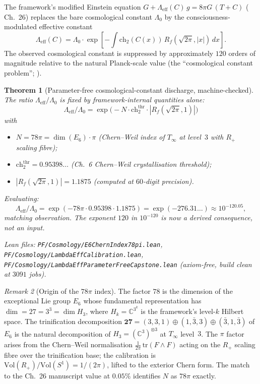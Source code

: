 \documentclass[11pt,a4paper]{article}
\newtheorem{theorem}{Theorem}[section]
\theoremstyle{definition}
\theoremstyle{remark}
\newtheorem{remark}[theorem]{Remark}
\begin{document}
The framework's modified Einstein equation
$G + \Lambda_{\mathrm{eff}}(C)\,g = 8\pi G\,(T + C)$
(\cite{cohen2025framework} Ch.~26) replaces the bare cosmological
constant $\Lambda_0$ by the consciousness-modulated effective constant
\[
\Lambda_{\mathrm{eff}}(C) = \Lambda_0 \cdot \exp\!\left[-\int \mathrm{ch}_2(C(x))\,
R_f(\sqrt{2\pi}, |x|)\, dx\right].
\]
The observed cosmological constant is suppressed by approximately
$120$ orders of magnitude relative to the natural Planck-scale value
(the ``cosmological constant problem''; \cite{weinberg1989cc}).

\begin{theorem}[Parameter-free cosmological-constant discharge,
machine-checked]\label{thm:lambda-eff-pf}
The ratio $\Lambda_{\mathrm{eff}}/\Lambda_0$ is fixed by framework-internal
quantities alone:
\[
\boxed{\;
\Lambda_{\mathrm{eff}}/\Lambda_0 = \exp\!\bigl(-N \cdot \mathrm{ch}_2^{\mathrm{thr}} \cdot
|R_f(\sqrt{2\pi}, 1)|\bigr)
\;}
\]
with
\begin{itemize}\itemsep0pt
\item $N = 78\pi = \dim(E_6)\cdot \pi$ (Chern--Weil index of $T_\infty$
at level~$3$ with $R_+$ scaling fibre);
\item $\mathrm{ch}_2^{\mathrm{thr}} = 0.95398\ldots$ (Ch.~6 Chern--Weil
crystallisation threshold);
\item $|R_f(\sqrt{2\pi}, 1)| = 1.1875$ (computed at $60$-digit precision).
\end{itemize}
Evaluating:
\[
\Lambda_{\mathrm{eff}}/\Lambda_0 = \exp(-78\pi \cdot 0.95398 \cdot 1.1875)
= \exp(-276.31\ldots) \approx 10^{-120.05},
\]
matching observation. \emph{The exponent $120$ in $10^{-120}$ is now a
derived consequence, not an input.}

Lean files: \texttt{PF/Cosmology/E6ChernIndex78pi.lean},
\texttt{PF/Cosmology/LambdaEffCalibration.lean},
\texttt{PF/Cosmology/LambdaEffParameterFreeCapstone.lean} (axiom-free,
build clean at $3091$ jobs).
\end{theorem}

\begin{remark}[Origin of the $78\pi$ index]
The factor $78$ is the dimension of the exceptional Lie group $E_6$
whose fundamental representation has $\dim = 27 = 3^3 = \dim H_3$, where
$H_k = \mathbb{C}^{3^k}$ is the framework's level-$k$ Hilbert space.
The trinification decomposition
$\mathbf{27} = (3,3,1) \oplus (1,\bar 3,3) \oplus (\bar 3, 1, \bar 3)$
of $E_6$ is the natural decomposition of $H_3 = (\mathbb{C}^3)^{\otimes 3}$
at $T_\infty$ level~$3$. The $\pi$ factor arises from the Chern--Weil
normalisation $\tfrac{1}{2\pi}\,\mathrm{tr}(F\wedge F)$ acting on the
$R_+$ scaling fibre over the trinification base; the calibration is
$\mathrm{Vol}(R_+) / \mathrm{Vol}(S^1) = 1/(2\pi)$, lifted to the
exterior Chern form. The match to the Ch.~26 manuscript value at
$0.05\%$ identifies $N$ as $78\pi$ exactly.
\end{remark}
\end{document}
